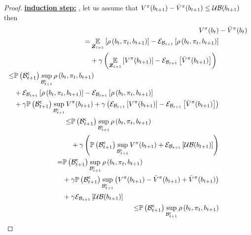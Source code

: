 \begin{proof}
	\textbf{\underline{induction step:}}
	, let us assume that $V^\pi(b_{t+1})-\bar{V}^\pi(b_{t+1})\leq\operatorname*{\mathcal{UB}}(b_{t+1})$ then
	\begin{align*}
		V^\pi(\blf{t})&-\bar{V}^\pi(\blf{t})\\
		\begin{split}
			=&\expectation{\reward{\blf{t},\pi_t,\blf{t+1}}}{\observationsRV{t+1}}-\partialexpectation{\reward{\blf{t},\pi_t,\blf{t+1}}}{\subSpaceI{t+1}}\\
			&+\gamma\left(\expectation{V^\pi(\blf{t+1})}{\observationsRV{t+1}}-\partialexpectation{\bar{V}^\pi(\blf{t+1})}{\subSpaceI{t+1}}\right)
		\end{split}\\
		\begin{split}
			\leq&\measure{\stcompI{\subSpace}{t+1}}\sup_{\stcompI{\subSpace}{t+1}}\reward{\blf{t},\pi_t,\blf{t+1}}\\
			&+\partialexpectation{\reward{\blf{t},\pi_t,\blf{t+1}}}{\subSpaceI{t+1}}-\partialexpectation{\reward{\blf{t},\pi_t,\blf{t+1}}}{\subSpaceI{t+1}}\\
			&+\gamma\measure{\stcompI{\subSpace}{t+1}}\sup_{\stcompI{\subSpace}{t+1}}V^\pi(\blf{t+1})+\gamma\left(\partialexpectation{V^\pi(\blf{t+1})}{\subSpaceI{t+1}}-\partialexpectation{\bar{V}^\pi(\blf{t+1})}{\subSpaceI{t+1}}\right)
		\end{split}\\
		\begin{split}
			\leq&\measure{\stcompI{\subSpace}{t+1}}\sup_{\stcompI{\subSpace}{t+1}}\reward{\blf{t},\pi_t,\blf{t+1}}\\
			&+\gamma\left(\measure{\stcompI{\subSpace}{t+1}}\sup_{\stcompI{\subSpace}{t+1}}V^\pi(\blf{t+1})+\partialexpectation{\upperbound(\blf{t+1})}{\subSpaceI{t+1}}\right)
		\end{split}\\
		\begin{split}
			=&\measure{\stcompI{\subSpace}{t+1}}\sup_{\stcompI{\subSpace}{t+1}}\reward{\blf{t},\pi_t,\blf{t+1}}\\
			&+\gamma\measure{\stcompI{\subSpace}{t+1}}\sup_{\stcompI{\subSpace}{t+1}}\left(V^\pi(\blf{t+1})-\bar{V}^\pi(\blf{t+1})+\bar{V}^\pi(\blf{t+1})\right) \\
			&+\gamma\partialexpectation{\upperbound(\blf{t+1})}{\subSpaceI{t+1}}
		\end{split}\\
		\begin{split}
			\leq&\measure{\stcompI{\subSpace}{t+1}}\sup_{\stcompI{\subSpace}{t+1}}\reward{\blf{t},\pi_t,\blf{t+1}}\\

\end{split}
\end{align*}
\end{proof}
